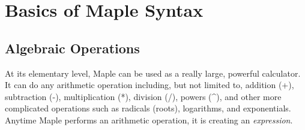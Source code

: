 \chapter{Basics of Maple Syntax}
\label{chp:basics_of_maple_syntax}

\section{Algebraic Operations}

At its elementary level, Maple can be used as a really large, powerful calculator. It can do any arithmetic operation including, but not limited to, addition (+), subtraction (-), multiplication (*), division (/), powers (\textasciicircum), and other more complicated operations such as radicals (roots), logarithms, and exponentials. Anytime Maple performs an arithmetic operation, it is creating an \textit{expression}.

\begin{maplegroup}
\begin{mapleinput}
\end{mapleinput}
\mapleresult
\begin{maplelatex}
\end{maplelatex}
\end{maplegroup}

\begin{maplegroup}
\begin{mapleinput}
\end{mapleinput}
\mapleresult
\begin{maplelatex}
\end{maplelatex}
\end{maplegroup}

\begin{maplegroup}
\begin{mapleinput}
\end{mapleinput}
\mapleresult
\begin{maplelatex}
\end{maplelatex}
\end{maplegroup}


